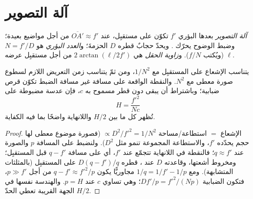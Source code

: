 \section{آلة التصوير}

\begin{definition}\label{def:b1:optical-instruments:camera}
\emph{آلة التصوير}  بعدها البؤري $f'$ تكوّن 
على مستقبِل، عند $\overline{OA'} \approx f'$ من أجل مواضيع بعيدة؛
وضبط الوضوح يحرّك . ويحدّ حجابٌ قطره $D$ الحزمةَ؛
و\emph{العدد البؤري} هو $N = f'/D$ (ويُكتب $f/N$). و\emph{زاوية
الحقل} هي $2\arctan(\ell/2f')$ من أجل مستقبِل عرضه $\ell$.
\end{definition}

\begin{proposition}\label{prop:b1:optical-instruments:dof}
يتناسب الإشعاع على المستقبِل مع $1/N^2$، ومن ثمّ يتناسب زمن التعريض
اللازم لسطوع صورة معطى مع $N^2$. والنقطة الواقعة على مسافة
غير مسافة الضبط تكوّن قرص ضبابية؛ وباشتراط أن يبقى
دون قطر مسموح به $c$، فإن عدسة مضبوطة على \emph{}
\[
H = \frac{f'^2}{N c}
\]
تُظهر كل ما بين $H/2$ واللانهاية واضحًا بما فيه الكفاية.
\end{proposition}

\begin{proof}
الإشعاع $=$ استطاعة/مساحة $\propto D^2/f'^2 = 1/N^2$ (فصورة موضوع
معطى لها حجم يحدّده $f'$، والاستطاعة المجموعة تنمو
مثل $D^2$). ولنضبط على المسافة $p$ والصورة عند $q \approx f'$؛
فالنقطة في اللانهاية تتجمّع عند $f'$، أي على مسافة $q - f'$ قبل المستقبِل؛
ومخروط أشعتها، وقاعدته $D$ عند ، قطره $D(q - f')/q$
على المستقبِل (بالمثلثات المتشابهة). ومع $1/q = 1/f' - 1/p$ مجاوريًّا يكون
$q - f' \approx f'^2/p$ من أجل $p \gg f'$، فتكون الضبابية
$Df'/p = f'^2/(Np)$؛ وهي تساوي $c$ عند $p = H$. والهندسة نفسها في
الجهة القريبة تعطي الحدّ $H/2$.
\end{proof}

